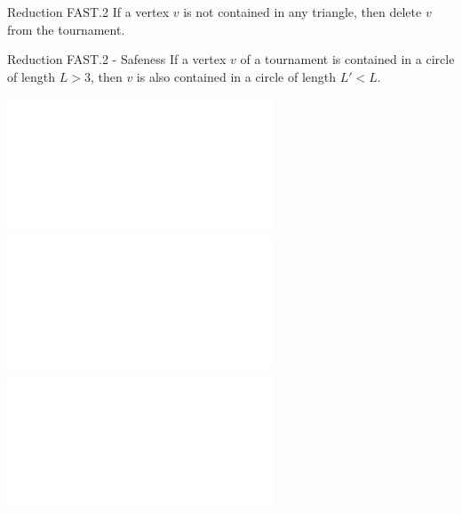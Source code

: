 \documentclass{beamer}
\begin{document}
	\begin{frame}[fragile]{Reduction FAST.2}
		If a vertex \(v\) is not contained in any triangle, then delete \(v\) from the tournament.
		\begin{center}
		\end{center}
	\end{frame}
	
	\begin{frame}[fragile]{Reduction FAST.2 - Safeness}
		If a vertex \(v\) of a tournament is contained in a circle of length $L > 3$, then $v$ is also contained in a circle of length $L' < L$.
		\begin{center}
		\includegraphics<2>[height=0.6\paperheight]{images/FAST_2/FAST2_Safeness1.pdf}
		\includegraphics<3>[height=0.6\paperheight]{images/FAST_2/FAST2_Safeness2.pdf} 
		\includegraphics<4>[height=0.6\paperheight]{images/FAST_2/FAST2_Safeness3.pdf} 
		\end{center}
	\end{frame}
	
\end{document}
